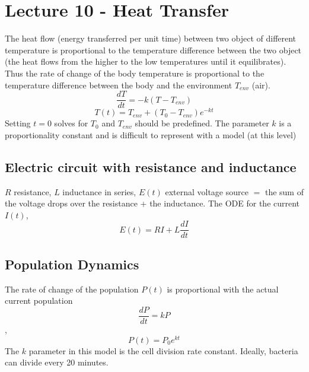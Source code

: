 \documentclass{report}
\theoremstyle{definition}
\theoremstyle{plain}
\theoremstyle{remark}
\begin{document}

\section{Lecture 10 - Heat Transfer}
The heat flow (energy transferred per unit time) between two object of
different temperature is proportional to the temperature difference between the
two object (the heat flows from the higher to the low temperatures until it
equilibrates). Thus the rate of change of the body temperature is proportional
to the temperature difference between the body and the environment $ T_{env}
$ (air). 
$$ \frac{dT}{dt} = - k(T-T_{env})  $$
$$ T(t) = T_{env} + (T_0 - T_{env})e^{-kt} $$
Setting $ t = 0 $ solves for $ T_0 $ and $ T_{env} $ should be predefined. The
parameter $ k $ is a proportionality constant and is difficult to represent
with a model (at this level)
\subsection{Electric circuit with resistance and inductance}
$ R $ resistance, $ L $ inductance in series, $ E(t) $ external voltage source
$ = $ the sum of the voltage drops over the resistance + the inductance.
The ODE for the current $ I(t) $,
$$ E(t) = RI + L \frac{dI}{dt} $$
\subsection{Population Dynamics}
The rate of change of the population $ P(t) $ is proportional with the actual
current population 
$$ \frac{dP}{dt} = kP $$, $$ P(t) = P_0 e^{kt} $$
The $ k $ parameter in this model is the cell division rate constant. Ideally,
bacteria can divide every 20 minutes.
\end{document}
